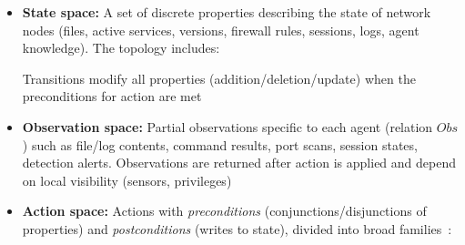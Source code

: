 \begin{itemize}
  \item \textbf{State space:} A set of discrete properties describing the state of network nodes (files, active services, versions, firewall rules, sessions, logs, agent knowledge). The topology includes:
        Transitions modify all properties (addition/deletion/update) when the preconditions for action are met
  \item \textbf{Observation space:} Partial observations specific to each agent (relation $Obs$) such as file/log contents, command results, port scans, session states, detection alerts. Observations are returned after action is applied and depend on local visibility (sensors, privileges)
  \item \textbf{Action space:} Actions with \emph{preconditions} (conjunctions/disjunctions of properties) and \emph{postconditions} (writes to state), divided into broad families~:

\end{itemize}
